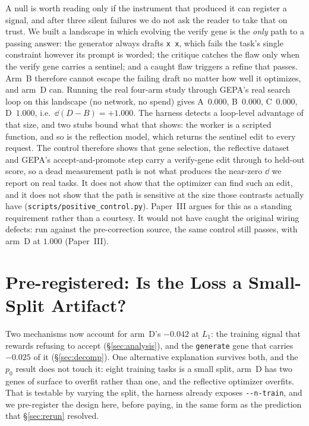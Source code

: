 \documentclass[11pt]{article}
\begin{document}
A null is worth reading only if the instrument that produced it can register a signal, and
after three silent failures we do not ask the reader to take that on trust. We built a
landscape in which evolving the verify gene is the \emph{only} path to a passing answer: the
generator always drafts \texttt{x\,x}, which fails the task's single constraint however its
prompt is worded; the critique catches the flaw only when the verify gene carries a sentinel;
and a caught flaw triggers a refine that passes. Arm~B therefore cannot escape the failing
draft no matter how well it optimizes, and arm~D can. Running the real four-arm study through
GEPA's real search loop on this landscape (no network, no spend) gives
A~$0.000$, B~$0.000$, C~$0.000$, D~$\mathbf{1.000}$, i.e.\ $\dd(D-B) = +1.000$. The harness
detects a loop-level advantage of that size, and two stubs bound what that shows: the worker is a
scripted function, and so is the reflection model, which returns the sentinel edit to every
request. The control therefore shows that gene selection, the reflective dataset and GEPA's accept-and-promote step carry a verify-gene
edit through to held-out score, so a dead measurement path is not what produces the near-zero
$\dd$ we report on real tasks. It does not show that the optimizer can find such an edit, and it
does not show that the path is sensitive at the size those contrasts actually have
(\texttt{scripts/positive\_control.py}). Paper~III argues for this as a standing requirement
rather than a courtesy. It would not have caught the original wiring defects: run against the
pre-correction source, the same control still passes, with arm~D at $1.000$ (Paper~III).

\section{Pre-registered: Is the Loss a Small-Split Artifact?}
\label{sec:prereg}
\label{sec:splitsweep}

Two mechanisms now account for arm~D's $-0.042$ at $L_1$: the training signal that rewards
refusing to accept (\S\ref{sec:analysis}), and the \texttt{generate} gene that carries $-0.025$
of it (\S\ref{sec:decomp}). One alternative explanation survives both, and the $p_0$ result
does not touch it: eight training tasks is a small split, arm~D has two genes of surface to
overfit rather than one, and the reflective optimizer overfits. That is testable by varying the
split, the harness already exposes \texttt{-{}-n-train}, and we pre-register the design here,
before paying, in the same form as the prediction that \S\ref{sec:rerun} resolved.
\end{document}
